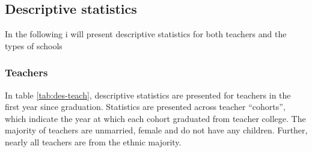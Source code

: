 \documentclass[
]{article}
\begin{document}
\hypertarget{descriptive-statistics}{%
\subsection{Descriptive statistics}\label{descriptive-statistics}}

In the following i will present descriptive statistics for both teachers and the types of schools

\hypertarget{teachers}{%
\subsubsection{Teachers}\label{teachers}}

In table \ref{tab:des-teach}, descriptive statistics are presented for teachers in the first year since graduation. Statistics are presented across teacher ``cohorts'', which indicate the year at which each cohort graduated from teacher college.
The majority of teachers are unmarried, female and do not have any children. Further, nearly all teachers are from the ethnic majority.
\end{document}
